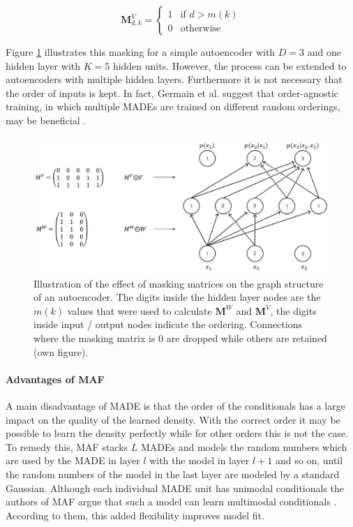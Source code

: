 \documentclass[11pt,titlepage,oneside,openany]{book}
\begin{document}
\begin{equation}
	\label{func:maskingV}
	\mathbf{M}_{d,k}^V = 
	\begin{cases}
		1 & \text{if $d > m(k)$}\\
		0 & \text{otherwise}
	\end{cases}
\end{equation}

\noindent Figure \ref{fig:MADE} illustrates this masking for a simple autoencoder with $D=3$ and one hidden layer with $K=5$ hidden units. However, the process can be extended to autoencoders with multiple hidden layers. Furthermore it is not necessary that the order of inputs is kept. In fact, Germain et al. suggest that order-agnostic training, in which multiple MADEs are trained on different random orderings, may be beneficial \cite{germain_made_nodate}.

\begin{figure}[h]
	\centering
	\includegraphics[width=\linewidth]{MADE_vis.jpg}
	\caption[Illustration of MADE]{Illustration of the effect of masking matrices on the graph structure of an autoencoder. The digits inside the hidden layer nodes are the $m(k)$ values that were used to calculate $\mathbf{M}^W$ and $\mathbf{M}^V$, the digits inside input / output nodes indicate the ordering. Connections where the masking matrix is 0 are dropped while others are retained (own figure).}
	\label{fig:MADE}
\end{figure}

\paragraph{Advantages of MAF}
\noindent A main disadvantage of MADE is that the order of the conditionals has a large impact on the quality of the learned density. With the correct order it may be possible to learn the density perfectly while for other orders this is not the case. To remedy this, MAF stacks $L$ MADEs and models the random numbers which are used by the MADE in layer $l$ with the model in layer $l+1$ and so on, until the random numbers of the model in the last layer are modeled by a standard Gaussian. Although each individual MADE unit has unimodal conditionals the authors of MAF argue that such a model can learn multimodal conditionals \cite{papamakarios_masked_2017}. According to them, this added flexibility improves model fit.
\end{document}
